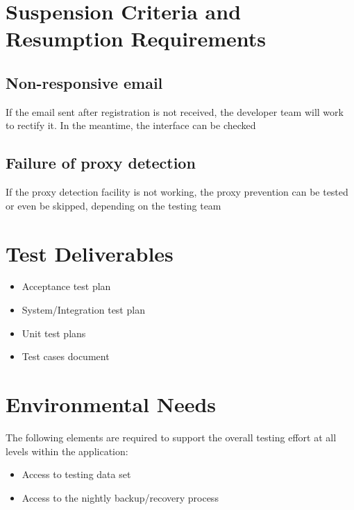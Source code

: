 \documentclass{scrreprt}
\begin{document}
\chapter{Suspension Criteria and Resumption Requirements}
\section{Non-responsive email}
If the email sent after registration is not received, the developer team will work to rectify it. In the meantime, the interface can be checked
\section{Failure of proxy detection}
If the proxy detection facility is not working, the proxy prevention can be tested or even be skipped, depending on the testing team

\chapter{Test Deliverables}
\begin{itemize}
    \item Acceptance test plan
    \item System/Integration test plan
    \item Unit test plans
    \item Test cases document
\end{itemize}

\chapter{Environmental Needs}
The following elements are required to support the overall testing effort at all levels within the application:
\begin{itemize}
    \item Access to testing data set 
    \item Access to the nightly backup/recovery process
\end{itemize}
\end{document}
